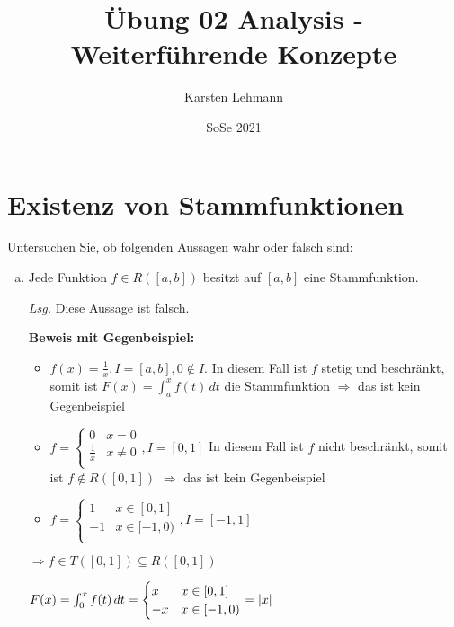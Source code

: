 \documentclass{article}
\author{Karsten Lehmann}
\date{SoSe 2021}
\title{Übung 02 Analysis - Weiterführende Konzepte}
\begin{document}
\section*{Existenz von Stammfunktionen}

Untersuchen Sie, ob folgenden Aussagen wahr oder falsch sind:

\begin{enumerate}[a)]
\item Jede Funktion $f \in R([a, b])$ besitzt auf $[a, b]$ eine Stammfunktion.

  \textit{Lsg.} Diese Aussage ist falsch.

  \textbf{Beweis mit Gegenbeispiel:}
  \begin{itemize}
  \item $f(x) = \frac{1}{x}, I = [a, b], 0 \notin I$.
    In diesem Fall ist $f$ stetig und beschränkt, somit ist
    $F(x) = \int_a^x f(t) \,dt$ die Stammfunktion $\Rightarrow$ das ist kein Gegenbeispiel
  \item $f = \begin{cases}
      0 & x = 0 \\
      \frac{1}{x} & x \ne 0 \\
    \end{cases}, I = [0, 1]$
    In diesem Fall ist $f$ nicht beschränkt, somit ist $f \notin R([0, 1])$
    $\Rightarrow$ das ist kein Gegenbeispiel
  \item $f = \begin{cases}
      1 & x \in [0, 1] \\
      -1 & x \in [-1, 0) \\
    \end{cases}, I = [-1, 1]$

  \end{itemize}

  $\Rightarrow f \in T([0, 1]) \subseteq R([0, 1])$

  $F(x) = \int_0^x f(t) \,dt = \begin{cases}
    x & x \in [0, 1] \\
    -x & x \in [-1, 0) \\
  \end{cases} = \abs{x}$


\end{enumerate}
\end{document}
